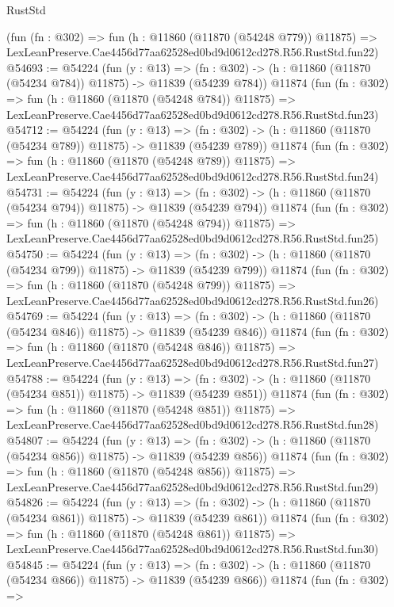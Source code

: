 \begin{lexlean}{RustStd}
\begin{coremodule}
    (fun (fn : @302) =>
    fun (h : @11860 (@11870 (@54248 @779)) @11875) =>
    LexLeanPreserve.Cae4456d77aa62528ed0bd9d0612cd278.R56.RustStd.fun22)
@54693 := @54224
    (fun (y : @13) =>
    (fn : @302) -> (h : @11860 (@11870 (@54234 @784)) @11875) -> @11839 (@54239 @784))
    @11874
    (fun (fn : @302) =>
    fun (h : @11860 (@11870 (@54248 @784)) @11875) =>
    LexLeanPreserve.Cae4456d77aa62528ed0bd9d0612cd278.R56.RustStd.fun23)
@54712 := @54224
    (fun (y : @13) =>
    (fn : @302) -> (h : @11860 (@11870 (@54234 @789)) @11875) -> @11839 (@54239 @789))
    @11874
    (fun (fn : @302) =>
    fun (h : @11860 (@11870 (@54248 @789)) @11875) =>
    LexLeanPreserve.Cae4456d77aa62528ed0bd9d0612cd278.R56.RustStd.fun24)
@54731 := @54224
    (fun (y : @13) =>
    (fn : @302) -> (h : @11860 (@11870 (@54234 @794)) @11875) -> @11839 (@54239 @794))
    @11874
    (fun (fn : @302) =>
    fun (h : @11860 (@11870 (@54248 @794)) @11875) =>
    LexLeanPreserve.Cae4456d77aa62528ed0bd9d0612cd278.R56.RustStd.fun25)
@54750 := @54224
    (fun (y : @13) =>
    (fn : @302) -> (h : @11860 (@11870 (@54234 @799)) @11875) -> @11839 (@54239 @799))
    @11874
    (fun (fn : @302) =>
    fun (h : @11860 (@11870 (@54248 @799)) @11875) =>
    LexLeanPreserve.Cae4456d77aa62528ed0bd9d0612cd278.R56.RustStd.fun26)
@54769 := @54224
    (fun (y : @13) =>
    (fn : @302) -> (h : @11860 (@11870 (@54234 @846)) @11875) -> @11839 (@54239 @846))
    @11874
    (fun (fn : @302) =>
    fun (h : @11860 (@11870 (@54248 @846)) @11875) =>
    LexLeanPreserve.Cae4456d77aa62528ed0bd9d0612cd278.R56.RustStd.fun27)
@54788 := @54224
    (fun (y : @13) =>
    (fn : @302) -> (h : @11860 (@11870 (@54234 @851)) @11875) -> @11839 (@54239 @851))
    @11874
    (fun (fn : @302) =>
    fun (h : @11860 (@11870 (@54248 @851)) @11875) =>
    LexLeanPreserve.Cae4456d77aa62528ed0bd9d0612cd278.R56.RustStd.fun28)
@54807 := @54224
    (fun (y : @13) =>
    (fn : @302) -> (h : @11860 (@11870 (@54234 @856)) @11875) -> @11839 (@54239 @856))
    @11874
    (fun (fn : @302) =>
    fun (h : @11860 (@11870 (@54248 @856)) @11875) =>
    LexLeanPreserve.Cae4456d77aa62528ed0bd9d0612cd278.R56.RustStd.fun29)
@54826 := @54224
    (fun (y : @13) =>
    (fn : @302) -> (h : @11860 (@11870 (@54234 @861)) @11875) -> @11839 (@54239 @861))
    @11874
    (fun (fn : @302) =>
    fun (h : @11860 (@11870 (@54248 @861)) @11875) =>
    LexLeanPreserve.Cae4456d77aa62528ed0bd9d0612cd278.R56.RustStd.fun30)
@54845 := @54224
    (fun (y : @13) =>
    (fn : @302) -> (h : @11860 (@11870 (@54234 @866)) @11875) -> @11839 (@54239 @866))
    @11874
    (fun (fn : @302) =>

\end{coremodule}
\end{lexlean}
